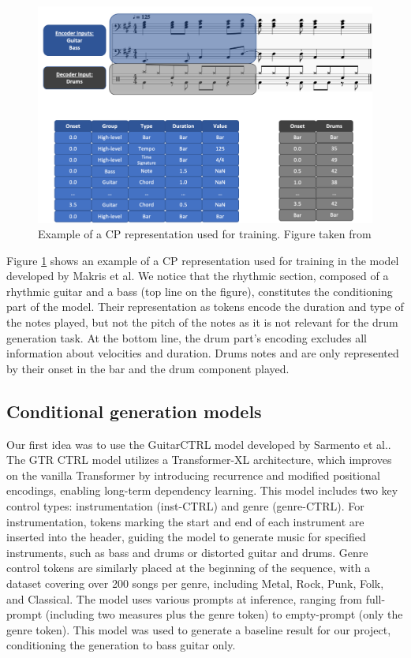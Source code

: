 \begin{figure}[!h]
    \centering
    \includegraphics[width=.9\linewidth]{../images-figures/tokenization_makris.png}
    \caption{Example of a CP representation used for training. Figure taken from \cite{makris_conditional_2022}}
    \label{fig:compound_gen_tokenization}
\end{figure}


Figure \ref{fig:compound_gen_tokenization} shows an example of a CP representation used for training in the model developed by Makris et al.
We notice that the rhythmic section, composed of a rhythmic guitar and a bass (top line on the figure), constitutes the conditioning part of the model.
Their representation as tokens encode the duration and type of the notes played, but not the pitch of the notes as it is not relevant for the drum generation task.
At the bottom line, the drum part's encoding excludes all information about velocities and duration.
Drums notes and are only represented by their onset in the bar and the drum component played.

\subsection{Conditional generation models}

Our first idea was to use the GuitarCTRL model developed by Sarmento et al.\cite{sarmento_gtr-ctrl_2023}.
The GTR CTRL model utilizes a Transformer-XL architecture\cite{dai_transformer-xl_2019}, which improves on the vanilla Transformer by introducing recurrence and modified positional encodings, enabling long-term dependency learning.
This model includes two key control types: instrumentation (inst-CTRL) and genre (genre-CTRL).
For instrumentation, tokens marking the start and end of each instrument are inserted into the header, guiding the model to generate music for specified instruments, such as bass and drums or distorted guitar and drums.
Genre control tokens are similarly placed at the beginning of the sequence, with a dataset covering over 200 songs per genre, including Metal, Rock, Punk, Folk, and Classical.
The model uses various prompts at inference, ranging from full-prompt (including two measures plus the genre token) to empty-prompt (only the genre token).
This model was used to generate a baseline result for our project, conditioning the generation to bass guitar only.


